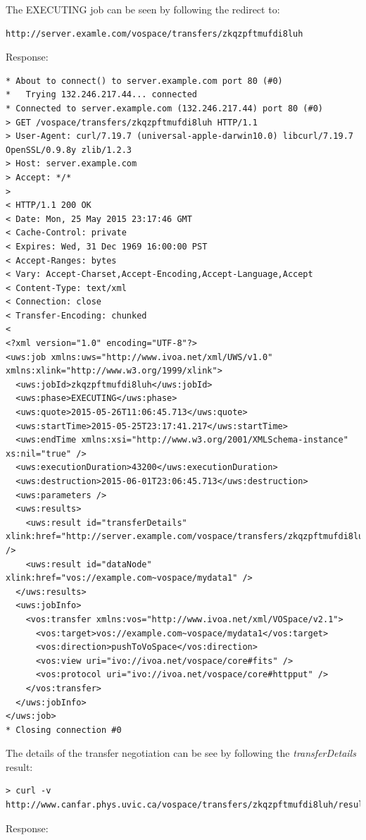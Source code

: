 \documentclass[11pt,a4paper]{ivoa}
\begin{document}
The EXECUTING job can be seen by following the redirect to:
\begin{lstlisting}
http://server.examle.com/vospace/transfers/zkqzpftmufdi8luh
\end{lstlisting}
Response:
\begin{lstlisting}
* About to connect() to server.example.com port 80 (#0)
*   Trying 132.246.217.44... connected
* Connected to server.example.com (132.246.217.44) port 80 (#0)
> GET /vospace/transfers/zkqzpftmufdi8luh HTTP/1.1
> User-Agent: curl/7.19.7 (universal-apple-darwin10.0) libcurl/7.19.7 OpenSSL/0.9.8y zlib/1.2.3
> Host: server.example.com
> Accept: */*
>
< HTTP/1.1 200 OK
< Date: Mon, 25 May 2015 23:17:46 GMT
< Cache-Control: private
< Expires: Wed, 31 Dec 1969 16:00:00 PST
< Accept-Ranges: bytes
< Vary: Accept-Charset,Accept-Encoding,Accept-Language,Accept
< Content-Type: text/xml
< Connection: close
< Transfer-Encoding: chunked
<
<?xml version="1.0" encoding="UTF-8"?>
<uws:job xmlns:uws="http://www.ivoa.net/xml/UWS/v1.0" xmlns:xlink="http://www.w3.org/1999/xlink">
  <uws:jobId>zkqzpftmufdi8luh</uws:jobId>
  <uws:phase>EXECUTING</uws:phase>
  <uws:quote>2015-05-26T11:06:45.713</uws:quote>
  <uws:startTime>2015-05-25T23:17:41.217</uws:startTime>
  <uws:endTime xmlns:xsi="http://www.w3.org/2001/XMLSchema-instance" xs:nil="true" />
  <uws:executionDuration>43200</uws:executionDuration>
  <uws:destruction>2015-06-01T23:06:45.713</uws:destruction>
  <uws:parameters />
  <uws:results>
    <uws:result id="transferDetails" xlink:href="http://server.example.com/vospace/transfers/zkqzpftmufdi8luh/results/transferDetails" />
    <uws:result id="dataNode" xlink:href="vos://example.com~vospace/mydata1" />
  </uws:results>
  <uws:jobInfo>
    <vos:transfer xmlns:vos="http://www.ivoa.net/xml/VOSpace/v2.1">
      <vos:target>vos://example.com~vospace/mydata1</vos:target>
      <vos:direction>pushToVoSpace</vos:direction>
      <vos:view uri="ivo://ivoa.net/vospace/core#fits" />
      <vos:protocol uri="ivo://ivoa.net/vospace/core#httpput" />
    </vos:transfer>
  </uws:jobInfo>
</uws:job>
* Closing connection #0
\end{lstlisting}
The details of the transfer negotiation can be see by following the \emph{transferDetails} result:
\begin{lstlisting}
> curl -v http://www.canfar.phys.uvic.ca/vospace/transfers/zkqzpftmufdi8luh/results/transferDetails
\end{lstlisting}
Response:
\end{document}
